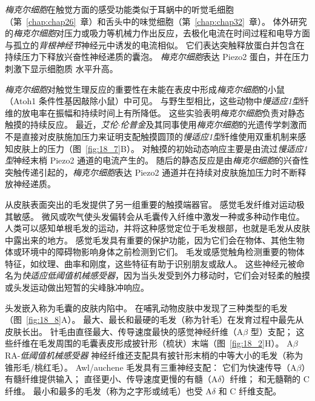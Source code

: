 \textit{梅克尔细胞}在触觉方面的感受功能类似于耳蜗中的听觉毛细胞（第~\ref{chap:chap26}~章）和舌头中的味觉细胞（第~\ref{chap:chap32}~章）。
体外研究的\textit{梅克尔细胞}对压力或吸力等机械力作出反应，去极化电流在时间过程和电导方面与孤立的\textit{背根神经节}神经元中诱发的电流相似。
它们表达突触释放蛋白并包含在持续压力下释放兴奋性神经递质的囊泡。
\textit{梅克尔细胞}表达 Piezo2 蛋白，并在压力刺激下显示细胞质  水平升高。


\textit{梅克尔细胞}对触觉生理反应的重要性在未能在表皮中形成\textit{梅克尔细胞}的小鼠（Atoh1 条件性基因敲除小鼠）中可见。
与野生型相比，这些动物中\textit{慢适应1型}纤维的放电率在振幅和持续时间上有所降低。
这些实验表明\textit{梅克尔细胞}负责对静态触摸的持续反应。 
最近，\textit{艾伦$\cdot$伦普金}及其同事使用\textit{梅克尔细胞}的光遗传学刺激而不是直接对皮肤施加压力来证明支配触摸圆顶的\textit{慢适应1型}纤维使用双重机制来感知皮肤上的压力（图~\ref{fig:18_7}B）。
对触摸的初始动态响应主要是由流过\textit{慢适应1型}神经末梢 Piezo2 通道的电流产生的。
随后的静态反应是由\textit{梅克尔细胞}的兴奋性突触传递引起的，\textit{梅克尔细胞}表达 Piezo2 通道并在持续对皮肤施加压力时不断释放神经递质。


从皮肤表面突出的毛发提供了另一组重要的触摸端器官。 
感觉毛发纤维对运动极其敏感。
微风或吹气使头发偏转会从毛囊传入纤维中激发一种或多种动作电位。
人类可以感知单根毛发的运动，并将这种感觉定位于毛发根部，也就是毛发从皮肤中露出来的地方。
感觉毛发具有重要的保护功能，因为它们会在物体、其他生物体或环境中的障碍物影响身体之前检测到它们。
毛发或感觉触角检测重要的物体特征，如纹理、曲率和刚度，这些特征有助于识别朋友或敌人。
这些神经元被命名为\textit{快适应低阈值机械感受器}，因为当头发受到外力移动时，它们会对轻柔的触摸或头发运动做出短暂的尖峰脉冲响应。


头发嵌入称为毛囊的皮肤内陷中。
在哺乳动物皮肤中发现了三种类型的毛发（图~\ref{fig:18_8}A）。
最大、最长和最硬的毛发（称为针毛）在发育过程中最先从皮肤长出。
针毛由直径最大、传导速度最快的感觉神经纤维（A$\beta$ 型）支配；
这些纤维在毛发周围的毛囊表皮形成披针形（梳状）末端（图~\ref{fig:18_2}H）。
A$\beta$ RA-\textit{低阈值机械感受器} 神经纤维还支配具有披针形末梢的中等大小的毛发（称为锥形毛/桃红毛）。
Awl/auchene 毛发具有三重神经支配：
它们为快速传导（A$\beta$）有髓纤维提供输入；
直径更小、传导速度更慢的有髓（A$\delta$）纤维；
和无髓鞘的 C 纤维。
最小和最多的毛发（称为之字形或绒毛）也受 A$\delta$ 和 C 纤维支配。


